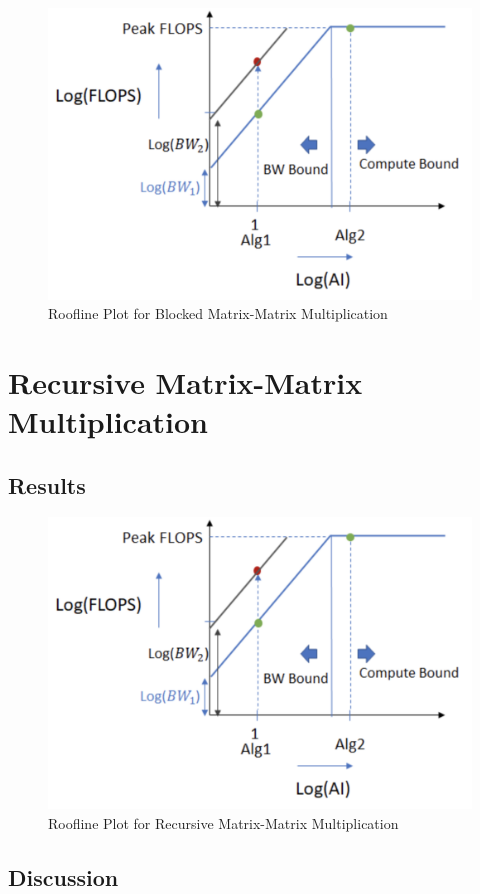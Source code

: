 \documentclass{article}
\begin{document}
\begin{figure}[!htb]
    \centering
    \includegraphics[width=0.8\linewidth]{roofline_plot.png}
    \caption{Roofline Plot for Blocked Matrix-Matrix Multiplication}
\end{figure}


\section{Recursive Matrix-Matrix Multiplication}

\subsection{Results}
\begin{figure}[!htb]
    \centering
    \includegraphics[width=0.8\linewidth]{roofline_plot.png}
    \caption{Roofline Plot for Recursive Matrix-Matrix Multiplication}
\end{figure}

\subsection{Discussion}
\begin{verbatim}
\end{verbatim}
\end{document}
